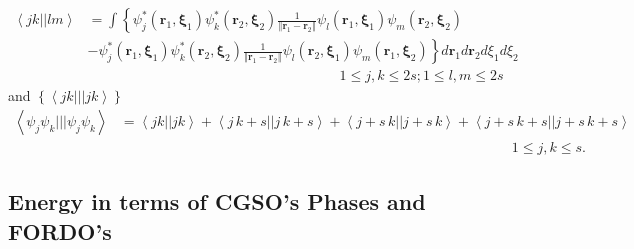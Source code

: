 \documentclass[aps,preprint]{revtex4}%
\begin{document}
\begin{align}
\left\langle jk||lm\right\rangle  &  =\int\left\{  \psi_{j}^{\ast}\left(
\mathbf{r}_{1}\mathbf{,\xi}_{1}\right)  \psi_{k}^{\ast}\left(  \mathbf{r}%
_{2}\mathbf{,\xi}_{2}\right)  \frac{1}{\left\Vert \mathbf{r}_{1}%
-\mathbf{r}_{2}\right\Vert }\psi_{l}\left(  \mathbf{r}_{1}\mathbf{,\xi}%
_{1}\right)  \psi_{m}\left(  \mathbf{r}_{2}\mathbf{,\xi}_{2}\right)  \right.
\nonumber\\
&  -\left.  \psi_{j}^{\ast}\left(  \mathbf{r}_{1}\mathbf{,\xi}_{1}\right)
\psi_{k}^{\ast}\left(  \mathbf{r}_{2}\mathbf{,\xi}_{2}\right)  \frac
{1}{\left\Vert \mathbf{r}_{1}-\mathbf{r}_{2}\right\Vert }\psi_{l}\left(
\mathbf{r}_{2}\mathbf{,\xi}_{1}\right)  \psi_{m}\left(  \mathbf{r}%
_{1}\mathbf{,\xi}_{2}\right)  \right\}  d\mathbf{r}_{1}d\mathbf{r}_{2}d\xi
_{1}d\xi_{2}\nonumber\\
&  \left.  {}\right.  \qquad\qquad\qquad\qquad\qquad\qquad\qquad\qquad
\qquad1\leq j,k\leq2s;1\leq l,m\leq2s \label{h2}%
\end{align}
and $\left\{  \left\langle jk|||jk\right\rangle \right\}  $
\begin{align}
\left\langle \psi_{j}\psi_{k}|||\psi_{j}\psi_{k}\right\rangle  &
=\left\langle jk||jk\right\rangle +\left\langle j\,k+s||j\,k+s\right\rangle
+\left\langle j+s\,k||j+s\,k\right\rangle +\left\langle
j+s\,k+s||j+s\,k+s\right\rangle \nonumber\\
&  \left.  {}\right.  \qquad\qquad\qquad\qquad\qquad\qquad\qquad\qquad
\qquad\qquad\qquad\qquad\qquad\qquad1\leq j,k\leq s.
\end{align}


\subsection{Energy in terms of CGSO's Phases and FORDO's}
\end{document}
